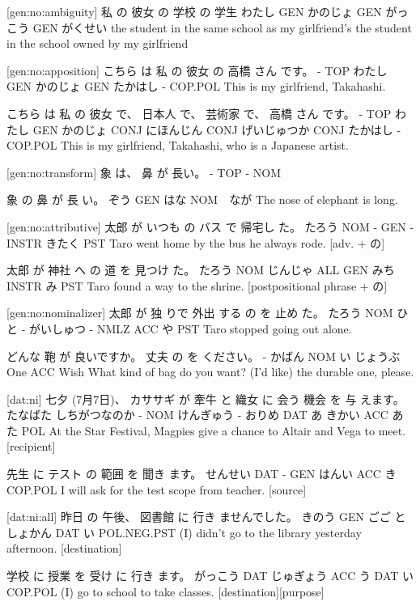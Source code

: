 [gen:no:ambiguity]
私    の   彼女    の  学校     の  学生
わたし GEN かのじょ GEN がっこう GEN がくせい
the student in the same school as my girlfriend's
the student in the school owned by my girlfriend

[gen:no:apposition]
こちら は 私     の  彼女    の  高橋   さん です。
-    TOP わたし GEN かのじょ GEN たかはし - COP.POL
This is my girlfriend, Takahashi.

こちら は  私    の  彼女    で、  日本人    で、  芸術家      で、  高橋   さん です。
-    TOP わたし GEN かのじょ CONJ にほんじん CONJ げいじゅつか CONJ たかはし - COP.POL
This is my girlfriend, Takahashi, who is a Japanese artist.

[gen:no:transform]
象 は、 鼻 が  長い。
-  TOP - NOM

象   の   鼻  が   長 い。
ぞう GEN はな NOM　なが
The nose of elephant is long.

[gen:no:attributive]
太郎   が いつも の  バス で    帰宅し た。
たろう NOM -   GEN  - INSTR きたく PST
Taro went home by the bus he always rode. [adv. + の]

太郎   が  神社    へ   の  道   を    見つけ た。
たろう NOM じんじゃ ALL GEN みち INSTR み    PST
Taro found a way to the shrine. [postpositional phrase + の]

[gen:no:nominalizer]
太郎   が  独 りで 外出 する   の    を  止め た。
たろう NOM ひと - がいしゅつ - NMLZ ACC や PST
Taro stopped going out alone.

どんな 鞄   が   良いですか。 丈夫    の  を ください。
-    かばん NOM い         じょうぶ One ACC Wish
What kind of bag do you want? (I'd like) the durable one, please.

[dat:ni]
七夕     (7月7日)、 カササギ が   牽牛    と 織女  に  会う 機会  を   与 えます。
たなばた しちがつなのか -    NOM けんぎゅう - おりめ DAT あ  きかい ACC あた POL
At the Star Festival, Magpies give a chance to Altair and Vega to meet. [recipient]

先生    に テスト の 範囲    を  聞き ます。
せんせい DAT -   GEN はんい ACC き COP.POL
I will ask for the test scope from teacher. [source]

[dat:ni:all]
昨日   の  午後、 図書館    に   行き ませんでした。
きのう GEN ごご   としょかん DAT い  POL.NEG.PST
(I) didn't go to the library yesterday afternoon. [destination]

学校    に   授業     を   受け に 行き ます。
がっこう DAT じゅぎょう ACC う  DAT い COP.POL
(I) go to school to take classes. [destination][purpose]

